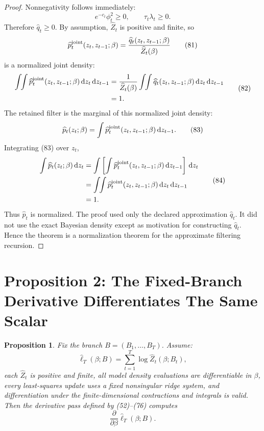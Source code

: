 \documentclass[11pt]{article}
\newtheorem{proposition}{Proposition}
\theoremstyle{remark}
\newcommand{\dd}{\,\mathrm d}
\newcommand{\widehatell}{\widehat\ell}
\begin{document}
\begin{proof}
Nonnegativity follows immediately:
\[
    e^{-c_t}\phi_t^2\ge0,
    \qquad
    \tau_t\lambda_t\ge0.
    \tag{80}
\]
Therefore \(\widehat q_t\ge0\).  By assumption,
\(\widehat Z_t\) is positive and finite, so
\[
    \widehat p_t^{\rm joint}(z_t,z_{t-1};\beta)
    =
    \frac{\widehat q_t(z_t,z_{t-1};\beta)}
    {\widehat Z_t(\beta)}
    \tag{81}
\]
is a normalized joint density:
\[
\begin{aligned}
    \int\!\!\int
    \widehat p_t^{\rm joint}(z_t,z_{t-1};\beta)
    \dd z_t\dd z_{t-1}
    &=
    \frac{1}{\widehat Z_t(\beta)}
    \int\!\!\int
    \widehat q_t(z_t,z_{t-1};\beta)
    \dd z_t\dd z_{t-1}\\
    &=
    1.
\end{aligned}
\tag{82}
\]
The retained filter is the marginal of this normalized joint density:
\[
    \widehat p_t(z_t;\beta)
    =
    \int
    \widehat p_t^{\rm joint}(z_t,z_{t-1};\beta)
    \dd z_{t-1}.
    \tag{83}
\]
Integrating (83) over \(z_t\),
\[
\begin{aligned}
    \int \widehat p_t(z_t;\beta)\dd z_t
    &=
    \int
    \left[
    \int \widehat p_t^{\rm joint}(z_t,z_{t-1};\beta)
    \dd z_{t-1}
    \right]\dd z_t\\
    &=
    \int\!\!\int
    \widehat p_t^{\rm joint}(z_t,z_{t-1};\beta)
    \dd z_t\dd z_{t-1}\\
    &=
    1.
\end{aligned}
\tag{84}
\]
Thus \(\widehat p_t\) is normalized.  The proof used only the declared
approximation \(\widehat q_t\).  It did not use the exact Bayesian density
except as motivation for constructing \(\widehat q_t\).  Hence the theorem is a
normalization theorem for the approximate filtering recursion.
\end{proof}

\section{Proposition 2: The Fixed-Branch Derivative Differentiates The Same Scalar}

\begin{proposition}
Fix the branch \(B=(B_1,\ldots,B_T)\).  Assume:
\[
    \widehatell_T(\beta;B)=\sum_{t=1}^T\log\widehat Z_t(\beta;B_t),
    \tag{85}
\]
each \(\widehat Z_t\) is positive and finite, all model density evaluations are
differentiable in \(\beta\), every least-squares update uses a fixed
nonsingular ridge system, and differentiation under the finite-dimensional
contractions and integrals is valid.  Then the derivative pass defined by
(52)--(76) computes
\[
    \frac{\partial}{\partial\beta}
    \widehatell_T(\beta;B).
    \tag{86}
\]
\end{proposition}
\end{document}

